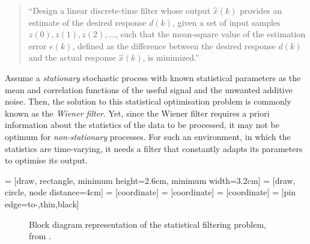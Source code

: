 \begin{quote}``Design a linear discrete-time filter whose output $\hat{x}(k)$ provides an estimate of the desired response $d(k)$, given a set of input samples $z(0), z(1), z(2), \dots$, such that the mean-square value of the estimation error $e(k)$, defined as the difference between the desired response $d(k)$ and the actual response $\hat{x}(k)$, is minimized.''
\end{quote}

Assume a \emph{stationary} stochastic process with known statistical parameters as the mean and correlation functions of the useful signal and the unwanted additive noise. Then, the solution to this statistical optimisation problem is commonly known as the \emph{Wiener filter}. Yet, since the Wiener filter requires a priori information about the statistics of the data to be processed, it may not be optimum for \emph{non-stationary} processes. For such an environment, in which the statistics are time-varying, it needs a filter that constantly adapts its parameters to optimise its output.

 = [draw, rectangle, 
    minimum height=2.6cm, minimum width=3.2cm]
 = [draw, circle, node distance=4cm]
 = [coordinate]
 = [coordinate]
 = [coordinate]
 = [pin edge={to-,thin,black}]

\begin{figure}[t]
\centering
{}
\caption{Block diagram representation of the statistical filtering problem, from \cite{haykin2002adaptive}.} \label{fig:filtering_problem}
\end{figure}

